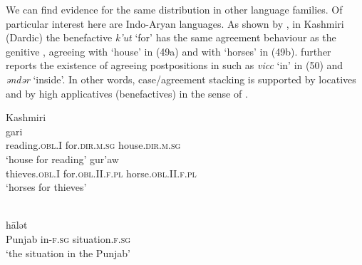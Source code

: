 \documentclass[output=paper]{langsci/langscibook}
\begin{document}
We can find evidence for the same distribution in other language families. Of particular interest here are Indo-Aryan languages. As shown by \citet{Payne1995}, in Kashmiri (Dardic) the benefactive  \textit{k’ut} ‘for’ has the same agreement behaviour as the genitive , agreeing with ‘house’ in (49a) and with ‘horses’ in (49b). \citet{Payne1995} further reports the existence of agreeing  postpositions in  such as \textit{vicc} ‘in’ in (50) and \textit{ənd}\textit{ər} ‘inside’. In other words, case\slash agreement stacking is supported by locatives and by high applicatives (benefactives) in the sense of \citet{Pylkkänen2008}.

\ea%
    Kashmiri \citep[293]{Payne1995}\label{ex:manzini:49}\\
    \ea
    \gll\relax [ paranas     k'ut]     gari \\
         {} reading.\textsc{obl}.I   for.\textsc{dir.m.sg}  house.\textsc{dir.m.sg}\\
    \glt ‘house for reading’  
    \ex  
    \gll\relax [ cur'an     k'it'aw]     gur'aw\\
         {} thieves.\textsc{obl}.I   for.\textsc{obl}.II.\textsc{f.pl}   horse.\textsc{obl.II.f.pl}\\
    \glt ‘horses for thieves’
    \z
\z

          

    

\ea%
          \citep[289]{Payne1995}\label{ex:manzini:50}\\
    \gll [ pənj\=ab  vicl-\=\i]    h\=alət        \\
         {} Punjab   in-\textsc{f.sg}  situation.\textsc{f.sg}\\
    \glt ‘the situation in the Punjab’ 
    \z
\end{document}
